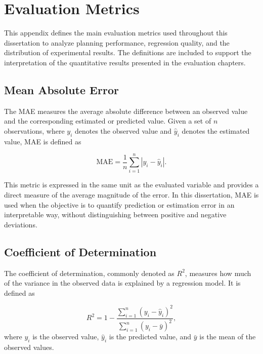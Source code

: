 \chapter{Evaluation Metrics}
\label{app:evaluation_metrics}
\hspace{\parindent}
This appendix defines the main evaluation metrics used throughout this dissertation to analyze
planning performance, regression quality, and the distribution of experimental results. The
definitions are included to support the interpretation of the quantitative results presented in the
evaluation chapters.

\section{Mean Absolute Error}
\label{app:mae}
\hspace{\parindent}
The MAE measures the average absolute difference between an observed value
and the corresponding estimated or predicted value. Given a set of \(n\) observations, where
\(y_i\) denotes the observed value and \(\hat{y}_i\) denotes the estimated value, MAE is defined as

\begin{equation}
    \mathrm{MAE} = \frac{1}{n} \sum_{i=1}^{n} \left| y_i - \hat{y}_i \right|.
\end{equation}

This metric is expressed in the same unit as the evaluated variable and provides a direct measure
of the average magnitude of the error. In this dissertation, MAE is used when the objective is to
quantify prediction or estimation error in an interpretable way, without distinguishing between
positive and negative deviations.

\section{Coefficient of Determination}
\label{app:r_squared}
\hspace{\parindent}
The coefficient of determination, commonly denoted as \(R^2\), measures how much of the variance in
the observed data is explained by a regression model. It is defined as

\begin{equation}
    R^2 = 1 - \frac{\sum_{i=1}^{n} \left(y_i - \hat{y}_i\right)^2}
    {\sum_{i=1}^{n} \left(y_i - \bar{y}\right)^2},
\end{equation}
where \(y_i\) is the observed value, \(\hat{y}_i\) is the predicted value, and \(\bar{y}\) is the
mean of the observed values.

